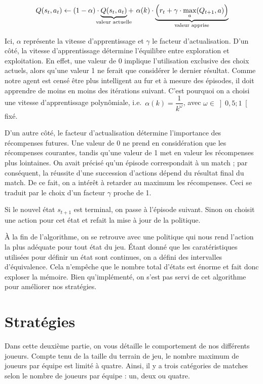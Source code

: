 \documentclass[12pt,a4paper]{article}
\begin{document}
\begin{equation*}
  Q(s_t,a_t) \gets (1-\alpha) \cdot 
  \underbrace{Q(s_t,a_t)}_{\mathclap{\text{valeur actuelle}}} + \ \alpha(k) 
\cdot \underbrace{\Big(r_t + \gamma \cdot \max_a(Q_{t+1},a) 
	\Big)}_{\mathclap{\text{valeur   apprise}}}
\end{equation*}

Ici, $\alpha$ repr\'esente la vitesse d'apprentissage et $\gamma$ le facteur 
d'actualisation. D'un c\^ot\'e, la vitesse d'apprentissage d\'etermine 
l'\'equilibre entre exploration et exploitation. En effet, une valeur de 
0 implique l'utilisation exclusive des choix actuels, alors qu'une 
valeur 1 ne ferait que consid\'erer le dernier r\'esultat.
Comme notre agent est cens\'e \^etre plus intelligent au fur et \`a mesure des 
\'episodes, il doit apprendre de moins en moins des it\'erations suivant. 
C'est pourquoi on a choisi une vitesse d'apprentissage polyn\^omiale, i.e.\ 
$\alpha(k)=\dfrac{1}{k^\omega}$, avec $\omega \in \left] 0,5;1 \right[$ fix\'e.

D'un autre c\^ot\'e, le facteur d'actualisation d\'etermine l'importance des 
r\'ecompenses futures. Une valeur de 0 ne prend en consid\'eration que les 
r\'ecompenses courantes, tandis qu'une valeur de 1 met en valeur les 
r\'ecompenses plus lointaines. On avait pr\'ecis\'e qu'un \'episode 
correspondait \`a un match ; par cons\'equent, la r\'eussite d'une succession 
d'actions d\'epend du r\'esultat final du match. De ce fait, on a int\'er\^et 
\`a retarder au maximum les r\'ecompenses. Ceci se traduit par le choix d'un 
facteur $\gamma$ proche de 1.

Si le nouvel \'etat $s_{t+1}$ est terminal, on passe \`a l'\'episode 
suivant. Sinon on choisit une action pour cet \'etat et refait la mise \`a jour 
de la politique.

\`A la fin de l'algorithme, on se retrouve avec une politique qui nous rend 
l'action la plus ad\'equate pour tout \'etat du jeu. \'Etant donn\'e que les 
carat\'eristiques utilis\'ees pour d\'efinir un \'etat sont continues, 
on a d\'efini des intervalles d'\'equivalence. Cela n'emp\^eche que le nombre 
total d'\'etats est \'enorme et fait donc exploser la m\'emoire. Bien 
qu'impl\'ement\'e, on s'est pas servi de cet algorithme pour am\'eliorer nos 
strat\'egies. 

\newpage

\part{Strat\'egies}
Dans cette deuxi\`eme partie, on vous d\'etaille le comportement de nos 
diff\'erents joueurs.
Compte tenu de la taille du terrain de jeu, le nombre maximum de joueurs par 
\'equipe est limit\'e \`a quatre. 
Ainsi, il y a trois cat\'egories de matches 
selon le nombre de joueurs par \'equipe : un, deux ou quatre.
\end{document}
